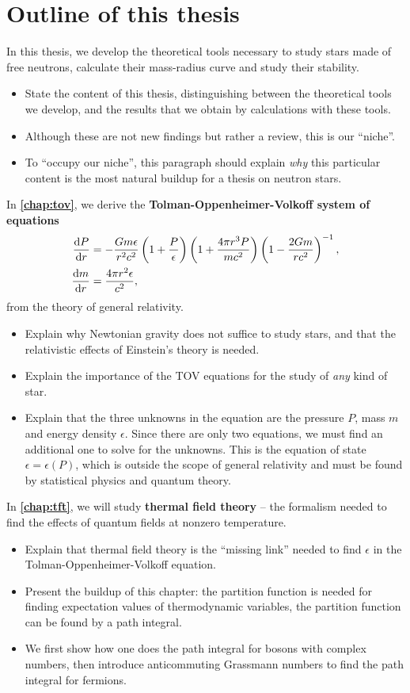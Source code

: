 \section*{Outline of this thesis}

In this thesis, we develop the theoretical tools necessary to study stars made of free neutrons, calculate their mass-radius curve and study their stability.
\begin{itemize}
\item State the content of this thesis, distinguishing between the theoretical tools we develop, and the results that we obtain by calculations with these tools.
\item Although these are not new findings but rather a review, this is our ``niche''.
\item To ``occupy our niche'', this paragraph should explain \emph{why} this particular content is the most natural buildup for a thesis on neutron stars.
\end{itemize}

In \textbf{\cref{chap:tov}}, we derive the \textbf{Tolman-Oppenheimer-Volkoff system of equations}
\begin{align*}
	\odv{P}{r} &= -\frac{G m \epsilon}{r^2 c^2} \left( 1 + \frac{P}{\epsilon} \right) \left( 1 + \frac{4 \pi r^3 P}{m c^2} \right) \left( 1 - \frac{2 G m}{r c^2} \right)^{-1} , \\
	\odv{m}{r} &= \frac{4 \pi r^2 \epsilon}{c^2} ,
\end{align*}
from the theory of general relativity.
\begin{itemize}
\item Explain why Newtonian gravity does not suffice to study stars, and that the relativistic effects of Einstein's theory is needed.
\item Explain the importance of the TOV equations for the study of \emph{any} kind of star.
\item Explain that the three unknowns in the equation are the pressure $P$, mass $m$ and energy density $\epsilon$.
      Since there are only two equations, we must find an additional one to solve for the unknowns.
      This is the equation of state $\epsilon = \epsilon(P)$, which is outside the scope of general relativity and must be found by statistical physics and quantum theory.
\end{itemize}

In \textbf{\cref{chap:tft}}, we will study \textbf{thermal field theory} -- the formalism needed to find the effects of quantum fields at nonzero temperature.
\begin{itemize}
\item Explain that thermal field theory is the ``missing link'' needed to find $\epsilon$ in the Tolman-Oppenheimer-Volkoff equation.
\item Present the buildup of this chapter: the partition function is needed for finding expectation values of thermodynamic variables, the partition function can be found by a path integral.
\item We first show how one does the path integral for bosons with complex numbers, then introduce anticommuting Grassmann numbers to find the path integral for fermions.
\end{itemize}

